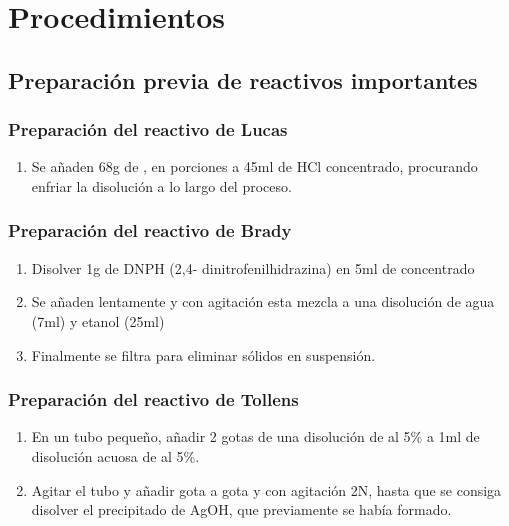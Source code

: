 \section{Procedimientos}

\subsection{Preparación previa de reactivos importantes}

\subsubsection{Preparación del reactivo de Lucas}
\begin{enumerate}
    \item Se añaden 68g de , en porciones a 45ml de HCl concentrado, procurando enfriar la disolución a lo largo del proceso.
\end{enumerate}

\subsubsection{Preparación del reactivo de Brady}
\begin{enumerate}
    \item Disolver 1g de DNPH (2,4- dinitrofenilhidrazina) en 5ml de  concentrado
    \item Se añaden lentamente y con agitación esta mezcla a una disolución de agua (7ml) y etanol (25ml)
    \item Finalmente se filtra para eliminar sólidos en suspensión.
\end{enumerate}

\subsubsection{Preparación del reactivo de Tollens}
\begin{enumerate}
    \item En un tubo pequeño, añadir 2 gotas de una disolución de  al 5\% a 1ml de disolución acuosa de  al 5\%.
    \item Agitar el tubo y añadir gota a gota y con agitación  2N, hasta que se consiga disolver el precipitado de AgOH, que previamente se había formado.
\end{enumerate}



